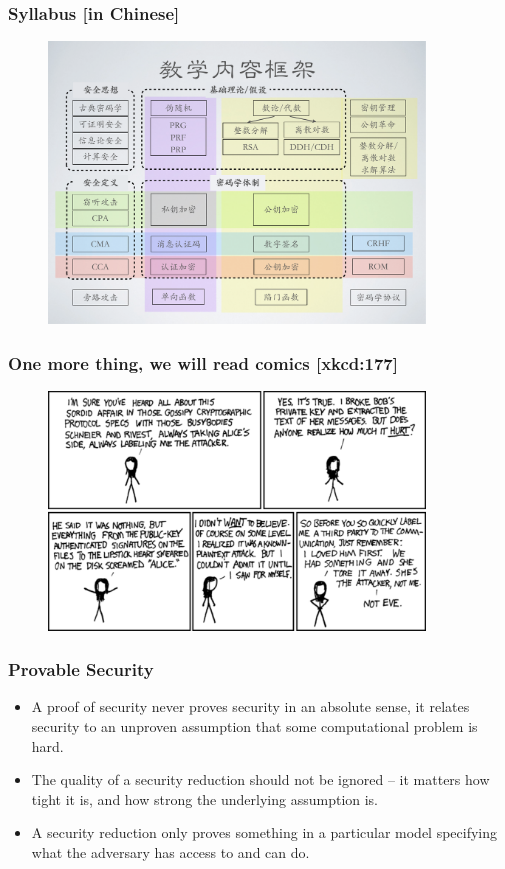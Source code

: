 \begin{frame}\frametitle{Syllabus [in Chinese]}
\begin{figure}
\begin{center}
\includegraphics[width=100mm]{pic/syllabus} 
\end{center}
\end{figure}
\end{frame}
\begin{frame}\frametitle{One more thing, we will read comics  [xkcd:177]}
\begin{figure}
\begin{center}
\includegraphics[width=100mm]{pic/term} 
\end{center}
\end{figure}
\end{frame}
\begin{frame}\frametitle{Provable Security}
\begin{itemize}
\item A proof of security never proves security in an absolute sense, it relates security to an unproven assumption that some computational problem is hard.
\item The quality of a security reduction should not be ignored -- it matters how tight it is, and how strong the underlying assumption is.
\item A security reduction only proves something in a particular model specifying what the adversary has access to and can do.
\end{itemize}
\end{frame}
